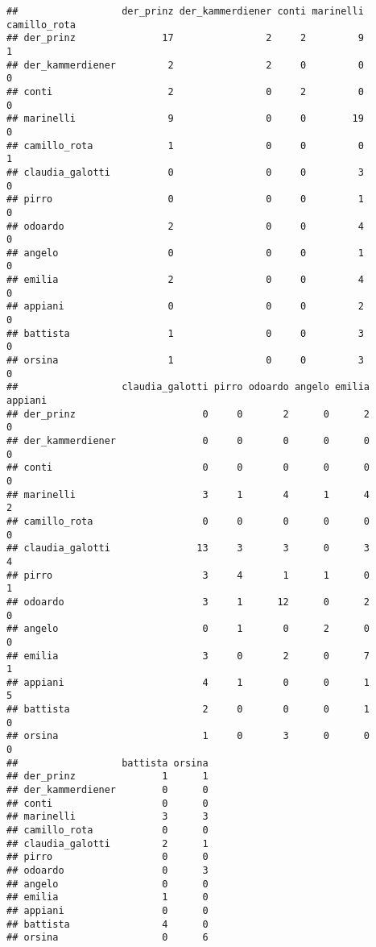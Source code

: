 \documentclass[]{book}
\begin{document}
\begin{verbatim}
##                  der_prinz der_kammerdiener conti marinelli camillo_rota
## der_prinz               17                2     2         9            1
## der_kammerdiener         2                2     0         0            0
## conti                    2                0     2         0            0
## marinelli                9                0     0        19            0
## camillo_rota             1                0     0         0            1
## claudia_galotti          0                0     0         3            0
## pirro                    0                0     0         1            0
## odoardo                  2                0     0         4            0
## angelo                   0                0     0         1            0
## emilia                   2                0     0         4            0
## appiani                  0                0     0         2            0
## battista                 1                0     0         3            0
## orsina                   1                0     0         3            0
##                  claudia_galotti pirro odoardo angelo emilia appiani
## der_prinz                      0     0       2      0      2       0
## der_kammerdiener               0     0       0      0      0       0
## conti                          0     0       0      0      0       0
## marinelli                      3     1       4      1      4       2
## camillo_rota                   0     0       0      0      0       0
## claudia_galotti               13     3       3      0      3       4
## pirro                          3     4       1      1      0       1
## odoardo                        3     1      12      0      2       0
## angelo                         0     1       0      2      0       0
## emilia                         3     0       2      0      7       1
## appiani                        4     1       0      0      1       5
## battista                       2     0       0      0      1       0
## orsina                         1     0       3      0      0       0
##                  battista orsina
## der_prinz               1      1
## der_kammerdiener        0      0
## conti                   0      0
## marinelli               3      3
## camillo_rota            0      0
## claudia_galotti         2      1
## pirro                   0      0
## odoardo                 0      3
## angelo                  0      0
## emilia                  1      0
## appiani                 0      0
## battista                4      0
## orsina                  0      6
\end{verbatim}
\end{document}
